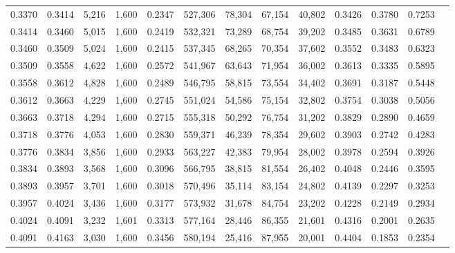 \begin{tabular}{rrrrrrrrrrrrr}
0.3370 & 0.3414 &  5,216 & 1,600 &                                     0.2347 & 527,306 &  78,304 &  67,154 &  40,802 & 0.3426 & 0.3780 & 0.7253 \\
0.3414 & 0.3460 &  5,015 & 1,600 &                                     0.2419 & 532,321 &  73,289 &  68,754 &  39,202 & 0.3485 & 0.3631 & 0.6789 \\
0.3460 & 0.3509 &  5,024 & 1,600 &                                     0.2415 & 537,345 &  68,265 &  70,354 &  37,602 & 0.3552 & 0.3483 & 0.6323 \\
0.3509 & 0.3558 &  4,622 & 1,600 &                                     0.2572 & 541,967 &  63,643 &  71,954 &  36,002 & 0.3613 & 0.3335 & 0.5895 \\
0.3558 & 0.3612 &  4,828 & 1,600 &                                     0.2489 & 546,795 &  58,815 &  73,554 &  34,402 & 0.3691 & 0.3187 & 0.5448 \\
0.3612 & 0.3663 &  4,229 & 1,600 &                                     0.2745 & 551,024 &  54,586 &  75,154 &  32,802 & 0.3754 & 0.3038 & 0.5056 \\
0.3663 & 0.3718 &  4,294 & 1,600 &                                     0.2715 & 555,318 &  50,292 &  76,754 &  31,202 & 0.3829 & 0.2890 & 0.4659 \\
0.3718 & 0.3776 &  4,053 & 1,600 &                                     0.2830 & 559,371 &  46,239 &  78,354 &  29,602 & 0.3903 & 0.2742 & 0.4283 \\
0.3776 & 0.3834 &  3,856 & 1,600 &                                     0.2933 & 563,227 &  42,383 &  79,954 &  28,002 & 0.3978 & 0.2594 & 0.3926 \\
0.3834 & 0.3893 &  3,568 & 1,600 &                                     0.3096 & 566,795 &  38,815 &  81,554 &  26,402 & 0.4048 & 0.2446 & 0.3595 \\
0.3893 & 0.3957 &  3,701 & 1,600 &                                     0.3018 & 570,496 &  35,114 &  83,154 &  24,802 & 0.4139 & 0.2297 & 0.3253 \\
0.3957 & 0.4024 &  3,436 & 1,600 &                                     0.3177 & 573,932 &  31,678 &  84,754 &  23,202 & 0.4228 & 0.2149 & 0.2934 \\
0.4024 & 0.4091 &  3,232 & 1,601 &                                     0.3313 & 577,164 &  28,446 &  86,355 &  21,601 & 0.4316 & 0.2001 & 0.2635 \\
0.4091 & 0.4163 &  3,030 & 1,600 &                                     0.3456 & 580,194 &  25,416 &  87,955 &  20,001 & 0.4404 & 0.1853 & 0.2354 \\

\end{tabular}

